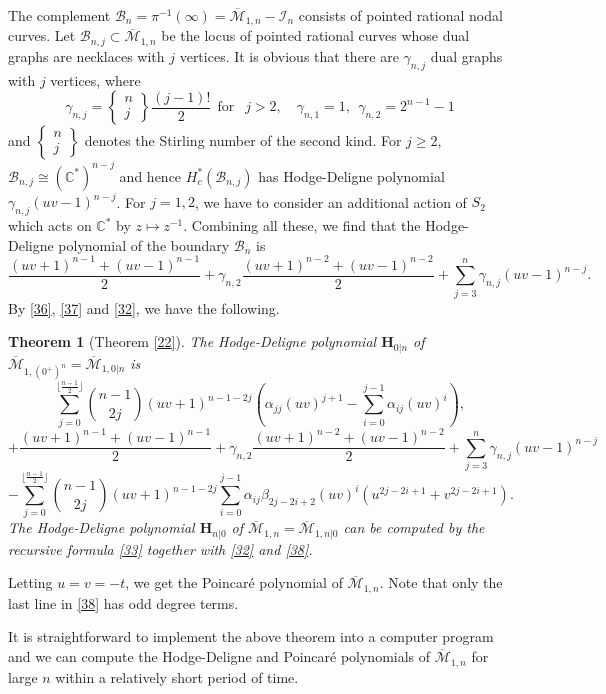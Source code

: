 \documentclass[11pt]{amsart}
\numberwithin{equation}{section}
\newtheorem{theo}{Theorem}[section]
\theoremstyle{definition}
\newcommand{\CC}{\mathbb{C}}
\newcommand{\bH}{\mathbf{H}}
\def\cB{{\mathcal B}}
\def\cM{{\mathcal M}}
\def\cI{{\mathcal I}}
\def\beq{\begin{equation}}
\def\eeq{\end{equation}}
\def\bcM{\overline{\cM}}
\begin{document}
The complement $\cB_n=\pi^{-1}(\infty)=\bcM_{1,n}-\cI_n$ consists of pointed rational nodal curves. 
Let $\cB_{n,j}\subset \bcM_{1,n}$ be the locus of pointed rational curves whose dual graphs are necklaces with $j$ vertices. 
It is obvious that there are $\gamma_{n,j}$
dual graphs with $j$ vertices, where
\[ \gamma_{n,j}=\left\{\begin{matrix} n\\ j\end{matrix}\right\}\frac{(j-1)!}{2} \ \ \text{for }\ \ j>2, \quad \gamma_{n,1}=1, \ \ \gamma_{n,2}=2^{n-1}-1\]
and $\left\{\begin{matrix} n\\ j\end{matrix}\right\}$ denotes the Stirling number of the second kind. 
For $j\ge 2$, $\cB_{n,j}\cong (\CC^*)^{n-j}$ and hence $H^*_c(\cB_{n,j})$ has Hodge-Deligne polynomial $\gamma_{n,j}(uv-1)^{n-j}$. For $j=1,2$, we have to consider an additional action of $S_2$ which acts on $\CC^*$ by $z\mapsto z^{-1}$. Combining all these, we find that the Hodge-Deligne polynomial of the boundary $\cB_n$ is 
\beq\label{37}
\frac{(uv+1)^{n-1}+(uv-1)^{n-1}}{2} + \gamma_{n,2} \frac{(uv+1)^{n-2}+(uv-1)^{n-2}}{2} + \sum_{j=3}^n \gamma_{n,j} (uv-1)^{n-j}.
\eeq
By \eqref{36}, \eqref{37} and  \eqref{32}, we have the following.
\begin{theo} [Theorem \ref{22}]
The Hodge-Deligne polynomial $\bH_{0|n}$ of $\bcM_{1,(0^+)^n}=\bcM_{1,0|n}$ is 
\beq\label{38}
\sum_{j=0}^{\lfloor\frac{n-1}{2}\rfloor} \binom{n-1}{2j} (uv+1)^{n-1-2j} \left( \alpha_{jj}(uv)^{j+1} - \sum_{i=0}^{j-1} \alpha_{ij}(uv)^i\right),
\eeq
\[ +\frac{(uv+1)^{n-1}+(uv-1)^{n-1}}{2} + \gamma_{n,2} \frac{(uv+1)^{n-2}+(uv-1)^{n-2}}{2} + \sum_{j=3}^n \gamma_{n,j} (uv-1)^{n-j} \]
\[-\sum_{j=0}^{\lfloor\frac{n-1}{2}\rfloor} \binom{n-1}{2j} (uv+1)^{n-1-2j}  \sum_{i=0}^{j-1} \alpha_{ij}\beta_{2j-2i+2}(uv)^i(u^{2j-2i+1}+v^{2j-2i+1}).  \]
The Hodge-Deligne polynomial $\bH_{n|0}$ of $\bcM_{1,n}=\bcM_{1,n|0}$ can be computed by the recursive formula \eqref{33} together with \eqref{32} and \eqref{38}.
\end{theo}
Letting $u=v=-t$, we get the Poincar\'e polynomial of $\bcM_{1,n}$. Note that only the last line in \eqref{38} has odd degree terms. 

It is straightforward to implement the above theorem into a computer program and we can compute the Hodge-Deligne and Poincar\'e polynomials of $\bcM_{1,n}$ for large $n$ within a relatively short period of time. %
\end{document}
